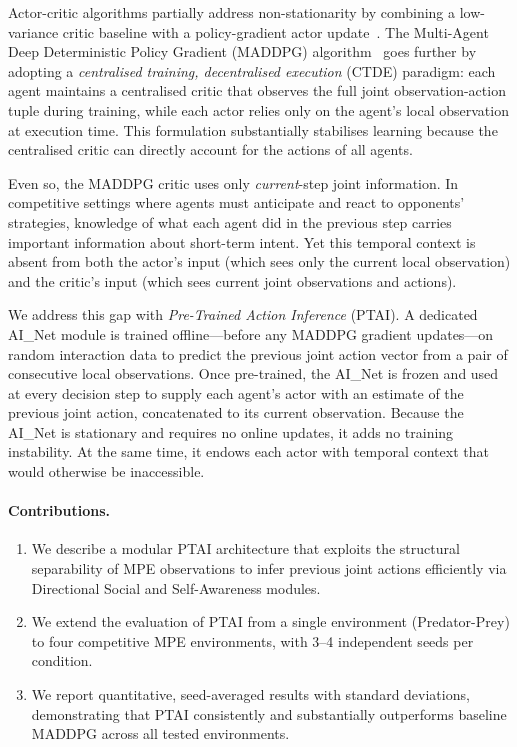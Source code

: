 \documentclass[12pt]{article}
\begin{document}
Actor-critic algorithms partially address non-stationarity by combining a low-variance
critic baseline with a policy-gradient actor update~\cite{mnih2016asynchronous}. The
Multi-Agent Deep Deterministic Policy Gradient (MADDPG) algorithm~\cite{lowe2017multi}
goes further by adopting a \emph{centralised training, decentralised execution} (CTDE)
paradigm: each agent maintains a centralised critic that observes the full joint
observation-action tuple during training, while each actor relies only on the agent's
local observation at execution time. This formulation substantially stabilises learning
because the centralised critic can directly account for the actions of all agents.

Even so, the MADDPG critic uses only \emph{current}-step joint information. In competitive
settings where agents must anticipate and react to opponents' strategies, knowledge of
what each agent did in the previous step carries important information about short-term
intent. Yet this temporal context is absent from both the actor's input (which sees only
the current local observation) and the critic's input (which sees current joint
observations and actions).

We address this gap with \emph{Pre-Trained Action Inference} (PTAI). A dedicated AI\_Net
module is trained offline---before any MADDPG gradient updates---on random interaction
data to predict the previous joint action vector from a pair of consecutive local
observations. Once pre-trained, the AI\_Net is frozen and used at every decision step to
supply each agent's actor with an estimate of the previous joint action, concatenated to
its current observation. Because the AI\_Net is stationary and requires no online updates,
it adds no training instability. At the same time, it endows each actor with temporal
context that would otherwise be inaccessible.

\paragraph{Contributions.}
\begin{enumerate}
\item We describe a modular PTAI architecture that exploits the structural separability of
      MPE observations to infer previous joint actions efficiently via Directional Social
      and Self-Awareness modules.
\item We extend the evaluation of PTAI from a single environment (Predator-Prey) to four
      competitive MPE environments, with 3--4 independent seeds per condition.
\item We report quantitative, seed-averaged results with standard deviations, demonstrating
      that PTAI consistently and substantially outperforms baseline MADDPG across all
      tested environments.
\end{enumerate}
\end{document}
